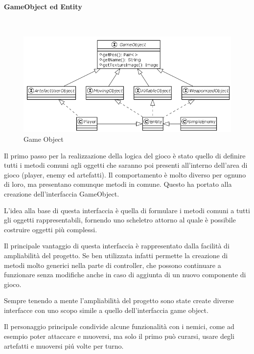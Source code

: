 \documentclass[a4paper,titlepage,12pt]{article}
\begin{document}
\paragraph{GameObject ed Entity}
\par \noindent \\
\begin{figure}[H]
    \centering
    \includegraphics[scale=0.55]{img/uml/GameObject.png}
    \caption{Game Object}
    \label{fig: Game Object}
\end{figure}
\par \noindent Il primo passo per la realizzazione della logica del gioco è stato quello di definire tutti i metodi comuni agli oggetti che saranno poi presenti all’interno dell’area di gioco (player, enemy ed artefatti). Il comportamento è molto diverso per ognuno di loro, ma presentano comunque metodi in comune. Questo ha portato alla creazione dell’interfaccia GameObject. 
\par \noindent L’idea alla base di questa interfaccia è quella di formulare i metodi comuni a tutti gli oggetti rappresentabili, fornendo uno scheletro attorno al quale è possibile costruire oggetti più complessi. 
\par \noindent Il principale vantaggio di questa interfaccia è rappresentato dalla facilità di ampliabilità del progetto. Se ben utilizzata infatti permette la creazione di metodi molto generici nella parte di controller, che possono continuare a funzionare senza modifiche anche in caso di aggiunta di un nuovo componente di gioco. 
\par \noindent Sempre tenendo a mente l’ampliabilità del progetto sono state create diverse interfacce con uno scopo simile a quello dell’interfaccia game object. 
\par \noindent Il personaggio principale condivide alcune funzionalità con i nemici, come ad esempio poter attaccare e muoversi, ma solo il primo può curarsi, usare degli artefatti e muoversi piú volte per turno.
\end{document}
